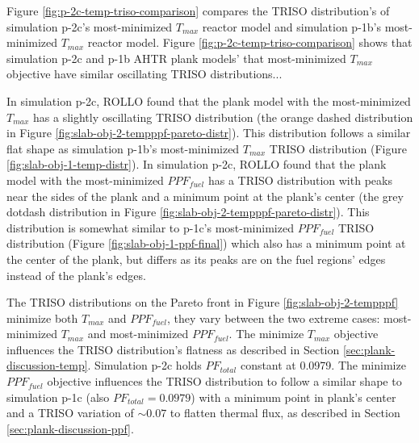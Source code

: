Figure \ref{fig:p-2c-temp-triso-comparison} compares the TRISO distribution's of 
simulation p-2c's most-minimized $T_{max}$ reactor model and simulation p-1b's 
most-minimized $T_{max}$ reactor model. 
Figure \ref{fig:p-2c-temp-triso-comparison} shows that simulation p-2c and 
p-1b AHTR plank models' that most-minimized $T_{max}$ objective have 
similar oscillating TRISO distributions... 

In simulation p-2c, \gls{ROLLO} found that the plank model with the most-minimized 
$T_{max}$ has a slightly oscillating TRISO distribution
(the orange dashed distribution in Figure \ref{fig:slab-obj-2-tempppf-pareto-distr}). 
This distribution follows a similar flat shape as simulation p-1b's most-minimized 
$T_{max}$ TRISO distribution (Figure \ref{fig:slab-obj-1-temp-distr}).
In simulation p-2c, \gls{ROLLO} found that the plank model with the most-minimized 
$PPF_{fuel}$ has a TRISO distribution with peaks near the sides of the plank and a 
minimum point at the plank's center (the grey dotdash distribution in Figure 
\ref{fig:slab-obj-2-tempppf-pareto-distr}). 
This distribution is somewhat similar to p-1c's most-minimized $PPF_{fuel}$ TRISO 
distribution (Figure \ref{fig:slab-obj-1-ppf-final}) which also has a minimum point 
at the center of the plank, but differs as its peaks are on the fuel regions' edges 
instead of the plank's edges. 

The \gls{TRISO} distributions on the Pareto front in Figure \ref{fig:slab-obj-2-tempppf} 
minimize both $T_{max}$ and $PPF_{fuel}$, they vary between the two extreme cases: 
most-minimized $T_{max}$ and most-minimized $PPF_{fuel}$. 
The minimize $T_{max}$ objective influences the TRISO distribution's flatness as 
described in Section \ref{sec:plank-discussion-temp}.
Simulation p-2c holds $PF_{total}$ constant at 0.0979. 
The minimize $PPF_{fuel}$ objective influences the TRISO distribution to follow 
a similar shape to simulation p-1c (also $PF_{total} = 0.0979$) with a minimum point in 
plank's center and a TRISO variation of $\sim0.07$ to flatten thermal flux, as 
described in Section \ref{sec:plank-discussion-ppf}. 

